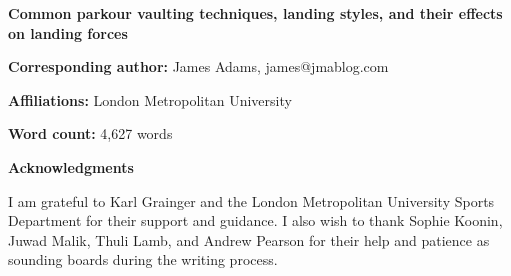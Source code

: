 

% 


\thispagestyle{empty}
\begin{center}
\vspace*{5cm}
{\headerfont\huge\bfseries Common parkour vaulting techniques, landing styles, and their effects on landing forces}

\vfill

\textbf{Corresponding author:} James Adams, james@jmablog.com

\textbf{Affiliations:} London Metropolitan University

\textbf{Word count:} 4,627 words

\end{center}

\newpage


\setcounter{page}{1}

\thispagestyle{empty}
\begin{center}
\vspace*{5cm}
{\headerfont\large\bfseries Acknowledgments}
\end{center}

I am grateful to Karl Grainger and the London Metropolitan University Sports Department for their support and guidance. I also wish to thank Sophie Koonin, Juwad Malik, Thuli Lamb, and Andrew Pearson for their help and patience as sounding boards during the writing process.

\newpage


